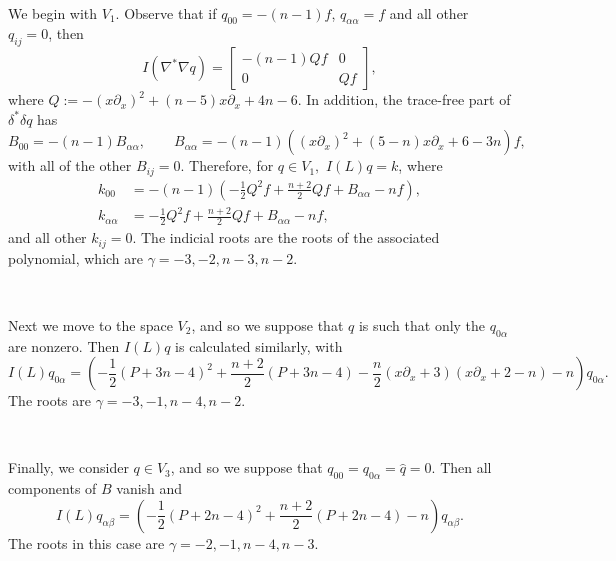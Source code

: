 \documentclass[10pt,reqno]{amsart}
\newcommand{\del}{\partial}
\begin{document}
\

We begin with $V_1.$ Observe that if $q_{00} = -(n-1)f$, $q_{\alpha \alpha} = f$
and all other $q_{ij} = 0$, then
\[
I(\nabla^* \nabla q) = \begin{bmatrix} - (n-1) Qf   & 0 \\ 0  & Q f \end{bmatrix},
\]
where $Q := - (x\del_x)^2 + (n-5) x\del_x + 4n-6$. In addition, the trace-free part of $\delta^* \delta q$ has 
\[
B_{00} = -(n-1)B_{\alpha \alpha}, \qquad B_{\alpha \alpha} = - (n-1)( (x\del_x)^2 +(5-n)x\del_x + 6-3n) f,
\]
with all of the other $B_{ij} = 0$.   Therefore, for $q \in V_1,$ $I(L)q = k$, where
\begin{align}
\nonumber k_{00} & = - (n-1) \left( -\frac12 Q^2 f + \frac{n+2}{2} Q f  +B_{\alpha \alpha} -n f\right), \\
k_{\alpha \alpha} &=  -\frac12 Q^2 f +  \frac{n+2}{2} Q f + B_{\alpha \alpha} - nf,
\label{eqn:ind rts V1}
\end{align}
and all other $k_{ij} = 0$. The indicial roots are the roots of the associated polynomial, which are $\gamma = -3, -2, n-3, n-2.$

\ 

Next we move to the space $V_2$, and so we suppose that $q$ is such that only the $q_{0\alpha}$ are nonzero. Then $I(L)q$ is calculated similarly, with
\begin{equation}
I(L)q_{0\alpha} = \left( - \frac12( P + 3n-4)^2 + \frac{n+2}{2} (P + 3n-4) - \frac{n}{2} (x\del_x + 3)(x\del_x + 2-n) - n\right) q_{0\alpha}.
\label{eqn:ind rts V2}
\end{equation}
The roots are  $\gamma = -3, -1, n-4, n-2.$

\ 

Finally, we consider $q \in V_3$, and so we suppose that $q_{00} = q_{0\alpha} = \hat{q} = 0$. Then all components of $B$ vanish and
\begin{equation}
I(L)q_{\alpha \beta} = \left(- \frac12(P + 2n-4)^2 + \frac{n+2}{2} (P + 2n-4) -n \right) q_{\alpha\beta}.
\label{eqn:ind rts V3}
\end{equation}
The roots in this case are $\gamma = -2, -1, n-4, n-3.$

\
\end{document}
